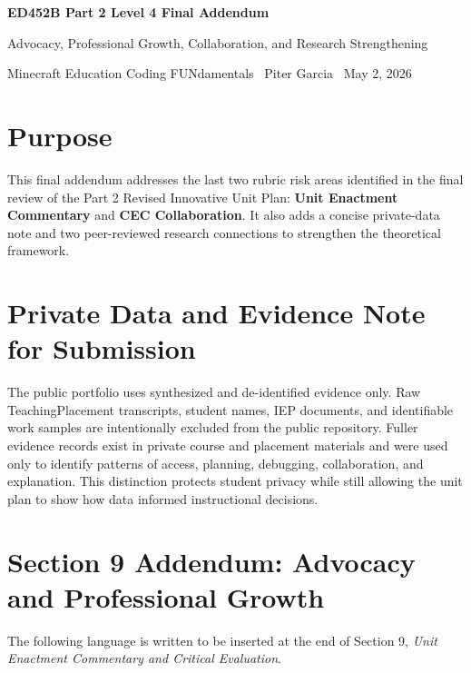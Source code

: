 \documentclass[12pt]{article}
\begin{document}
\begin{center}
{\Large\bfseries\color{navyBlue} ED452B Part 2 Level 4 Final Addendum}\par
{\large Advocacy, Professional Growth, Collaboration, and Research Strengthening}\par
{\normalsize Minecraft Education Coding FUNdamentals \textperiodcentered\ Piter Garcia \textperiodcentered\ May 2, 2026}\par
\end{center}

\section*{Purpose}

This final addendum addresses the last two rubric risk areas identified in the final review of the Part 2 Revised Innovative Unit Plan: \textbf{Unit Enactment Commentary} and \textbf{CEC Collaboration}. It also adds a concise private-data note and two peer-reviewed research connections to strengthen the theoretical framework.

\section{Private Data and Evidence Note for Submission}

The public portfolio uses synthesized and de-identified evidence only. Raw TeachingPlacement transcripts, student names, IEP documents, and identifiable work samples are intentionally excluded from the public repository. Fuller evidence records exist in private course and placement materials and were used only to identify patterns of access, planning, debugging, collaboration, and explanation. This distinction protects student privacy while still allowing the unit plan to show how data informed instructional decisions.

\section{Section 9 Addendum: Advocacy and Professional Growth}

The following language is written to be inserted at the end of Section 9, \emph{Unit Enactment Commentary and Critical Evaluation}.
\end{document}
